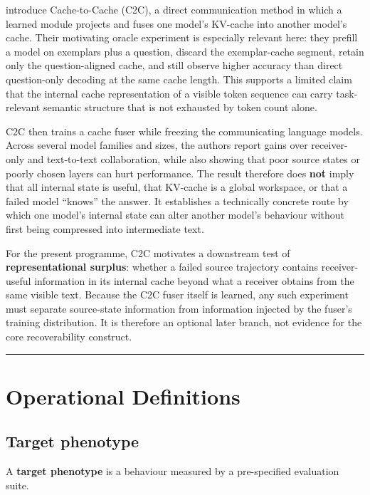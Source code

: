 \textcite{fu2026c2c} introduce Cache-to-Cache (C2C), a direct communication method in which a learned module projects and fuses one model's KV-cache into another model's cache. Their motivating oracle experiment is especially relevant here: they prefill a model on exemplars plus a question, discard the exemplar-cache segment, retain only the question-aligned cache, and still observe higher accuracy than direct question-only decoding at the same cache length. This supports a limited claim that the internal cache representation of a visible token sequence can carry task-relevant semantic structure that is not exhausted by token count alone.

C2C then trains a cache fuser while freezing the communicating language models. Across several model families and sizes, the authors report gains over receiver-only and text-to-text collaboration, while also showing that poor source states or poorly chosen layers can hurt performance. The result therefore does \textbf{not} imply that all internal state is useful, that KV-cache is a global workspace, or that a failed model ``knows'' the answer. It establishes a technically concrete route by which one model's internal state can alter another model's behaviour without first being compressed into intermediate text.

For the present programme, C2C motivates a downstream test of \textbf{representational surplus}: whether a failed source trajectory contains receiver-useful information in its internal cache beyond what a receiver obtains from the same visible text. Because the C2C fuser itself is learned, any such experiment must separate source-state information from information injected by the fuser's training distribution. It is therefore an optional later branch, not evidence for the core recoverability construct.

\begin{center}\rule{0.5\linewidth}{0.5pt}\end{center}

\section{Operational Definitions}\label{operational-definitions}

\subsection{Target phenotype}\label{target-phenotype}

A \textbf{target phenotype} is a behaviour measured by a pre-specified evaluation suite.

